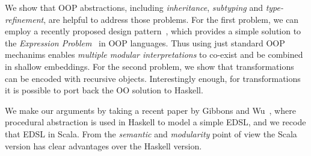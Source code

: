 We show that OOP abstractions, including \emph{
  inheritance}, \emph{subtyping} and \emph{type-refinement}, are
helpful to address those problems. For the first problem, we can
employ a recently proposed design pattern~\cite{eptrivially16}, which provides a simple
solution to the \emph{Expression Problem}~\cite{expPb} in OOP languages. Thus
using just standard OOP mechanims enables \emph{multiple modular
  interpretations} to co-exist and be combined in shallow embeddings.
For the second problem, we show that transformations can be encoded 
with recursive objects. Interestingly enough, for transformations it
is possible to port back the OO solution to
Haskell.

We make our arguments by taking a recent paper by Gibbons and Wu~\cite{gibbons2014folding},
where procedural abstraction is used in Haskell to model a simple
EDSL, and we recode that EDSL in Scala. From the \emph{semantic} and \emph{modularity} point of view the
Scala version has clear advantages over the Haskell version.

\begin{comment}
In summary, our contributions are:

\begin{itemize}

\item {}

\item {\bf Multiple Modular Interpretations for Shallow Embeddings:} 
  We show that with standard OOP mechanisms it is easy to support multiple modular
  interpretations for shallow embeddings.

\item {\bf Transformations for Shallow Embeddings:} We show that
  transformations are encodable with recursive objects. Moreover, this technique
  can be ported back into functional programming as well.

\end{itemize}
\end{comment}
